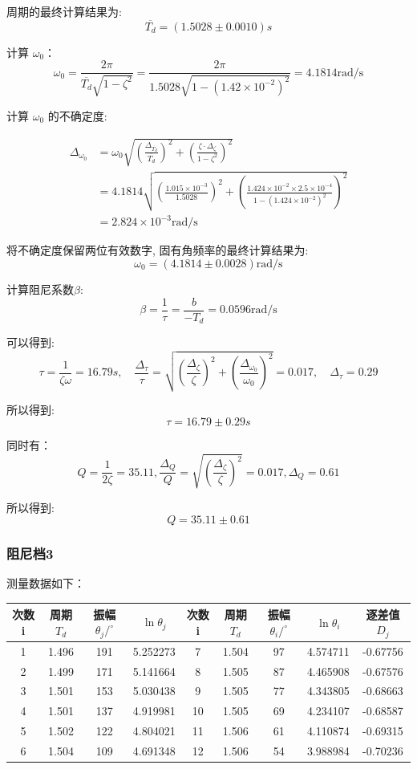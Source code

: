 \documentclass[UTF8]{ctexart}
\begin{document}
周期的最终计算结果为:
$$
\overline{T_{d}}=(1.5028 \pm 0.0010) s
$$

计算  $\omega_{0} $：
$$
\omega_{0}=\frac{2 \pi}{\overline{T_{d}} \sqrt{1-\zeta^{2}}}=\frac{2 \pi}{1.5028 \sqrt{1-\left(1.42 \times 10^{-2}\right)^{2}}}=4.1814 \mathrm{rad} / \mathrm{s}
$$

计算  $\omega_{0} $ 的不确定度:

\begin{align}
\Delta_{\omega_{0}}&=\omega_{0} \sqrt{\left(\frac{\Delta_{\overline{T_{d}}}}{\overline{T_{d}}}\right)^{2}+\left(\frac{\zeta \cdot \Delta_{\zeta}}{1-\zeta^{2}}\right)^{2}} \nonumber \\
&=4.1814 \sqrt{\left(\frac{1.015 \times 10^{-3}}{1.5028}\right)^{2}+\left(\frac{1.424 \times 10^{-2} \times 2.5 \times 10^{-4}}{1-\left(1.424 \times 10^{-2}\right)^{2}}\right)^{2}} \nonumber\\
&=2.824 \times 10^{-3} \mathrm{rad} / \mathrm{s} \nonumber
\end{align}

将不确定度保留两位有效数字, 固有角频率的最终计算结果为:
$$
\omega_{0}=(4.1814 \pm 0.0028) \mathrm{rad} / \mathrm{s}
$$

计算阻尼系数$\beta$:
$$
\beta=\frac{1}{\tau}=\frac{b}{-T_{d}}=0.0596 \mathrm{rad} / \mathrm{s}
$$

可以得到:
$$
\tau=\frac{1}{\zeta \omega}=16.79 s, \quad \frac{\Delta_{\tau}}{\tau}=\sqrt{\left(\frac{\Delta_{\zeta}}{\zeta}\right)^{2}+\left(\frac{\Delta_{\omega_{0}}}{\omega_{0}}\right)^{2}}=0.017, \quad \Delta_{\tau}=0.29
$$

所以得到:
$$
\tau=16.79 \pm 0.29 s
$$

同时有：
$$
Q=\frac{1}{2 \zeta}=35.11, \frac{\Delta_{Q}}{Q}=\sqrt{\left(\frac{\Delta_{\zeta}}{\zeta}\right)^{2}}=0.017, \Delta_{Q}=0.61
$$

所以得到:
$$
Q=35.11 \pm 0.61
$$



\subsubsection{阻尼档3}
测量数据如下：

\begin{tabular}{|c|c|c|c|c|c|c|c|c|}
\hline   次数  i &  周期$T_d$&振幅  $\theta_{j} /^{\circ}$ & $\ln \theta_{j} $&  次数  i &周期$T_d$&  振幅  $\theta_{i} /^{\circ}$ & $\ln \theta_{i}$& 逐差值$D_j$ \\
\hline 1 & 1.496 & 191 & 5.252273 & 7 & 1.504 & 97 & 4.574711 & -0.67756 \\
\hline 2 & 1.499 & 171 & 5.141664 & 8 & 1.505 & 87 & 4.465908 & -0.67576 \\
\hline 3 & 1.501 & 153 & 5.030438 & 9 & 1.505 & 77 & 4.343805 & -0.68663 \\
\hline 4 & 1.501 & 137 & 4.919981 & 10 & 1.505 & 69 & 4.234107 & -0.68587 \\
\hline 5 & 1.502 & 122 & 4.804021 & 11 & 1.506 & 61 & 4.110874 & -0.69315 \\
\hline 6 & 1.504 & 109 & 4.691348 & 12 & 1.506 & 54 & 3.988984 & -0.70236 \\
\hline
\end{tabular}
\end{document}
